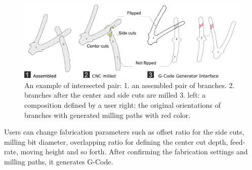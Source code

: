 \begin{figure}[ht]
  \begin{center}
    \includegraphics[width = 0.4\paperwidth]{images/system/joint_milling_diagram_4.png}
    \caption{An example of intersected pair: 1. an assembled pair of branches. 2. branches after the center and side cuts are milled 3. left: a composition defined by a user right: the original orientations of branches with generated milling paths with red color.  }
    \label{fig:joint_geometry}
  \end{center}
\end{figure}

Users can change fabrication parameters such as offset ratio for the side cuts, milling bit diameter, overlapping ratio for defining the center cut depth, feed-rate, moving height and so forth.
After confirming the fabrication settings and milling paths, it generates G-Code.
